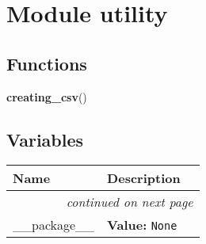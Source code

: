 %
%
%


\section{Module utility}

    \label{utility}


  \subsection{Functions}

    \label{utility:creating_csv}

    \vspace{0.5ex}

\hspace{.8\funcindent}\begin{boxedminipage}{\funcwidth}

    \raggedright \textbf{creating\_csv}()

\setlength{\parskip}{2ex}
\setlength{\parskip}{1ex}
    \end{boxedminipage}



  \subsection{Variables}

    \vspace{-1cm}
\hspace{\varindent}\begin{longtable}{|p{\varnamewidth}|p{\vardescrwidth}|l}
\cline{1-2}
\cline{1-2} \centering \textbf{Name} & \centering \textbf{Description}& \\
\cline{1-2}
\endhead\cline{1-2}\multicolumn{3}{r}{\small\textit{continued on next page}}\\\endfoot\cline{1-2}
\endlastfoot\raggedright \_\-\_\-p\-a\-c\-k\-a\-g\-e\-\_\-\_\- & \raggedright \textbf{Value:} 
{\tt None}&\\
\cline{1-2}
\end{longtable}

